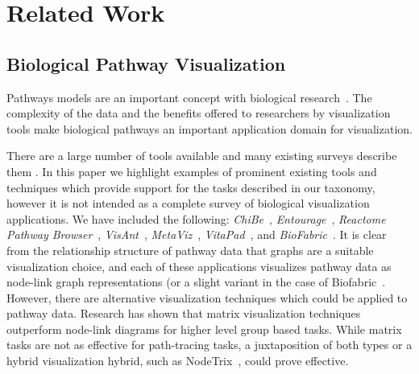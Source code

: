 \documentclass[journal]{vgtc}                %
\begin{document}
\section{Related Work}
\subsection{Biological Pathway Visualization}


Pathways models are an important concept with biological research~\cite{cairns2011regulation, luo2003targeting,reya2001stem}.
The complexity of the data and the benefits offered to researchers by visualization tools make biological pathways an important application domain for visualization.


There are a large number of tools available and many existing surveys describe them \cite{Suderman2007tools,pavlopoulos2008survey,Gehlenborg2010omics}.
In this paper we highlight examples of prominent existing tools and techniques which provide support for the tasks described in our taxonomy, however it is not intended as a complete survey of biological visualization applications.
We have included the following: \textit{ChiBe}~\cite{Babur2010chibe}, \textit{Entourage}~\cite{Lex2013entourage}, \textit{Reactome Pathway Browser}~\cite{croft2014reactome}, \textit{VisAnt}~\cite{hu2004visant}, \textit{MetaViz}~\cite{bourqui2007metabolic}, \textit{VitaPad}~\cite{holford2005vitapad}, and \textit{BioFabric}~\cite{Longabaugh2012biofabric}.
It is clear from the relationship structure of pathway data that graphs are a suitable visualization choice, and each of these applications visualizes pathway data as node-link graph representations (or a slight variant in the case of Biofabric~\cite{Longabaugh2012biofabric}.
However, there are alternative visualization techniques which could be applied to pathway data.
Research has shown that matrix visualization techniques outperform node-link diagrams for higher level group based tasks\cite{Ghoniem2004,Henry2007}.
While matrix tasks are not as effective for path-tracing tasks, a juxtaposition of both types or a hybrid visualization hybrid, such as NodeTrix~\cite{NodeTrix2007}, could prove effective.
\end{document}
